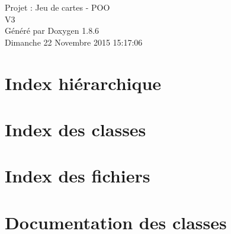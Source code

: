 \documentclass[twoside]{book}
\newcommand{\clearemptydoublepage}{%
  \newpage{\pagestyle{empty}\cleardoublepage}%
}
\begin{document}
\hypersetup{pageanchor=false}
\begin{titlepage}
\vspace*{7cm}
\begin{center}%
{\Large Projet \-: Jeu de cartes -\/ P\-O\-O \\[1ex]\large V3 }\\
\vspace*{1cm}
{\large Généré par Doxygen 1.8.6}\\
\vspace*{0.5cm}
{\small Dimanche 22 Novembre 2015 15:17:06}\\
\end{center}
\end{titlepage}
\clearemptydoublepage
\tableofcontents
\clearemptydoublepage
{}
\hypersetup{pageanchor=true}

\chapter{Index hiérarchique}

\chapter{Index des classes}

\chapter{Index des fichiers}

\chapter{Documentation des classes}































\end{document}

